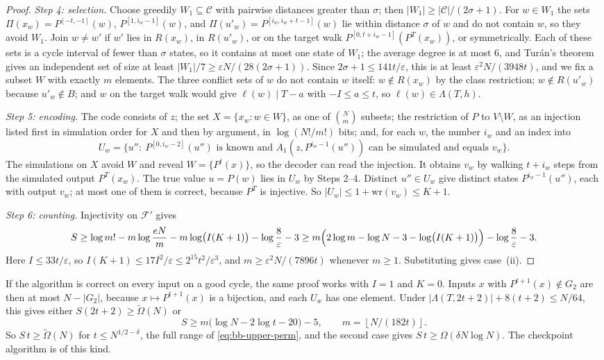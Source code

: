 \documentclass[11pt]{article}
\theoremstyle{definition}
\theoremstyle{remark}
\newcommand{\floor}[1]{\left\lfloor #1\right\rfloor}
\numberwithin{equation}{section}
\begin{document}
\begin{proof}
\emph{Step 4: selection.}  Choose greedily $W_1\subseteq\mathcal C$ with
pairwise distances greater than $\sigma$; then
$|W_1|\geq|\mathcal C|/(2\sigma+1)$.  For $w\in W_1$ the sets
$\Pi(x_w)=P^{[-t,-1]}(w)$, $P^{[1,i_w-1]}(w)$, and
$\Pi(u'_w)=P^{[i_w,i_w+t-1]}(w)$ lie within distance $\sigma$ of $w$ and
do not contain $w$, so they avoid $W_1$.  Join $w\neq w'$ if $w'$ lies in
$R(x_w)$, in $R(u'_w)$, or on the target walk
$P^{[0,t+i_w-1]}(P^T(x_w))$, or symmetrically.  Each of these sets is a
cycle interval of fewer than $\sigma$ states, so it contains at most one
state of $W_1$; the average degree is at most $6$, and Tur\'an's theorem
gives an independent set of size at least
$|W_1|/7\geq\varepsilon N/(28(2\sigma+1))$.  Since
$2\sigma+1\leq141t/\varepsilon$, this is at least
$\varepsilon^2N/(3948t)$, and we fix a subset $W$ with exactly $m$
elements.  The three conflict sets of $w$ do not contain $w$ itself:
$w\notin R(x_w)$ by the class restriction; $w\notin R(u'_w)$ because
$u'_w\notin B$; and $w$ on the target walk would give
$\ell(w)\mid T-a$ with $-I\leq a\leq t$, so $\ell(w)\in\Lambda(T,h)$.

\emph{Step 5: encoding.}  The code consists of $z$; the set
$X=\{x_w:w\in W\}$, as one of $\binom Nm$ subsets; the restriction of $P$
to $V\setminus W$, as an injection listed first in simulation order for
$X$ and then by argument, in $\log(N!/m!)$ bits; and, for each $w$, the
number $i_w$ and an index into
\[
  U_w=\bigl\{u'':\ P^{[0,i_w-2]}(u'')\text{ is known and }
     A_1(z,P^{i_w-1}(u''))\text{ can be simulated and equals }v_w\bigr\}.
\]
The simulations on $X$ avoid $W$ and reveal $W=\{P^t(x)\}$, so the decoder
can read the injection.  It obtains $v_w$ by walking $t+i_w$ steps from
the simulated output $P^T(x_w)$.  The true value $u=P(w)$ lies in $U_w$ by
Steps 2--4.  Distinct $u''\in U_w$ give distinct states $P^{i_w-1}(u'')$,
each with output $v_w$; at most one of them is correct, because $P^T$ is
injective.  So $|U_w|\leq1+\mathrm{wr}(v_w)\leq K+1$.

\emph{Step 6: counting.}  Injectivity on $\mathcal F'$ gives
\[
  S\geq\log m!-m\log\frac{eN}m-m\log\bigl(I(K+1)\bigr)
  -\log\frac8\varepsilon-3
  \geq m\Bigl(2\log m-\log N-3-\log\bigl(I(K+1)\bigr)\Bigr)
  -\log\frac8\varepsilon-3.
\]
Here $I\leq33t/\varepsilon$, so $I(K+1)\leq17I^2/\varepsilon\leq2^{15}t^2/\varepsilon^3$,
and $m\geq\varepsilon^2N/(7896t)$ whenever $m\geq1$.  Substituting gives
case~(ii).
\end{proof}

If the algorithm is correct on every input on a good cycle, the same
proof works with $I=1$ and $K=0$.  Inputs $x$ with $P^{t+1}(x)\notin G_2$
are then at most $N-|G_2|$, because $x\mapsto P^{t+1}(x)$ is a bijection,
and each $U_w$ has one element.  Under $|\Lambda(T,2t+2)|+8(t+2)\leq N/64$,
this gives either $S(2t+2)\geq\widetilde\Omega(N)$ or
\[
  S\geq m\bigl(\log N-2\log t-20\bigr)-5,\qquad m=\floor{N/(182t)}.
\]
So $S\,t\geq\widetilde\Omega(N)$ for $t\leq N^{1/2-\delta}$, the full range of
\cref{eq:bb-upper-perm}, and the second case gives
$S\,t\geq\Omega(\delta N\log N)$.  The checkpoint algorithm is of this
kind.
\end{document}
